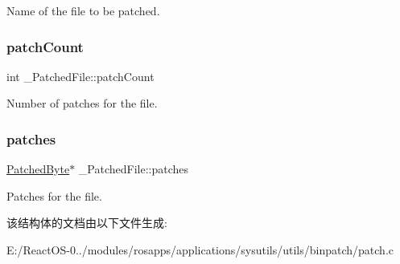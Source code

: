 Name of the file to be patched. \mbox{\label{struct___patched_file_a7f582540ab5747ff31b2db544dbae9db}} 
\subsubsection{\texorpdfstring{patch\+Count}{patchCount}}
{\footnotesize\ttfamily int \+\_\+\+Patched\+File\+::patch\+Count}

Number of patches for the file. \mbox{\label{struct___patched_file_a083bafded4ce3f4595e31b76920c7b54}} 
\subsubsection{\texorpdfstring{patches}{patches}}
{\footnotesize\ttfamily \hyperlink{struct___patched_byte}{Patched\+Byte}$\ast$ \+\_\+\+Patched\+File\+::patches}

Patches for the file. 

该结构体的文档由以下文件生成\+:\begin{DoxyCompactItemize}
\item 
E\+:/\+React\+O\+S-\/0../modules/rosapps/applications/sysutils/utils/binpatch/patch.\+c\end{DoxyCompactItemize}
